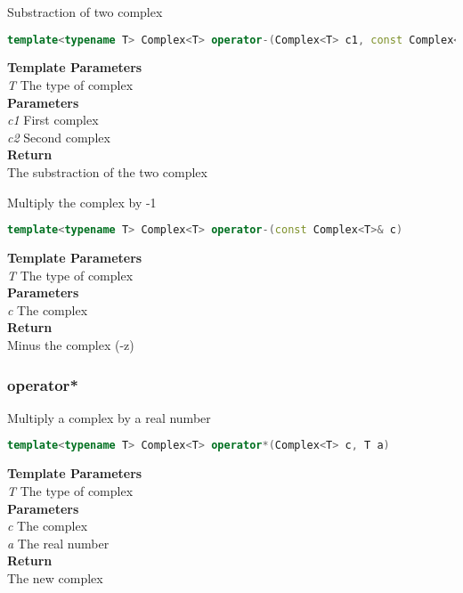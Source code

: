\begin{mdframed}
Substraction of two complex
\begin{lstlisting}[language=C++]
template<typename T> Complex<T> operator-(Complex<T> c1, const Complex<T>& c2) 
\end{lstlisting}
\textbf{Template Parameters} \\ 
\textit{T} The type of complex \\ 
\textbf{Parameters} \\ 
\textit{c1} First complex \\ 
\textit{c2} Second complex \\ 
\textbf{Return} \\ 
The substraction of the two complex\\ 
\end{mdframed}

\begin{mdframed}
Multiply the complex by -1
\begin{lstlisting}[language=C++]
template<typename T> Complex<T> operator-(const Complex<T>& c) 
\end{lstlisting}
\textbf{Template Parameters} \\ 
\textit{T} The type of complex \\ 
\textbf{Parameters} \\ 
\textit{c} The complex \\ 
\textbf{Return} \\ 
Minus the complex (-z)\\ 
\end{mdframed}

\subsubsection{operator*}
\begin{mdframed}
Multiply a complex by a real number
\begin{lstlisting}[language=C++]
template<typename T> Complex<T> operator*(Complex<T> c, T a) 
\end{lstlisting}
\textbf{Template Parameters} \\ 
\textit{T} The type of complex \\ 
\textbf{Parameters} \\ 
\textit{c} The complex \\ 
\textit{a} The real number \\ 
\textbf{Return} \\ 
The new complex\\ 
\end{mdframed}

